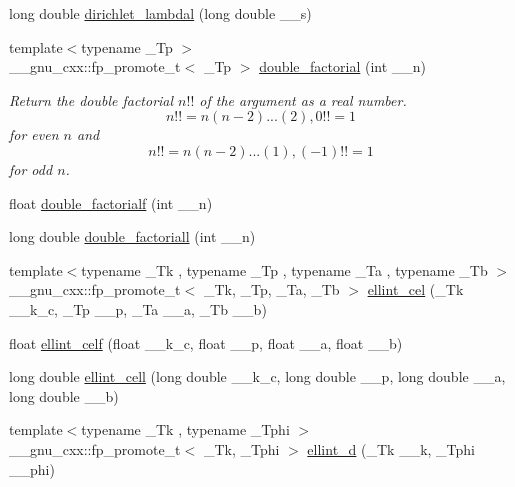 \begin{DoxyCompactItemize}
\item 
long double \hyperlink{group__gnu__math__spec__func_gab28d06c4e3c7457f1fa3663168678fb2}{dirichlet\+\_\+lambdal} (long double \+\_\+\+\_\+s)
\item 
{\footnotesize template$<$typename \+\_\+\+Tp $>$ }\\\+\_\+\+\_\+gnu\+\_\+cxx\+::fp\+\_\+promote\+\_\+t$<$ \+\_\+\+Tp $>$ \hyperlink{group__gnu__math__spec__func_ga1e62c47f84f9782828f8830b4fedc13c}{double\+\_\+factorial} (int \+\_\+\+\_\+n)
\begin{DoxyCompactList}\small\item\em Return the double factorial $ n!! $ of the argument as a real number. \[ n!! = n(n-2)...(2), 0!! = 1 \] for even $ n $ and \[ n!! = n(n-2)...(1), (-1)!! = 1 \] for odd $ n $. \end{DoxyCompactList}\item 
float \hyperlink{group__gnu__math__spec__func_ga85ec284e603f32d18970bbdbb12d5150}{double\+\_\+factorialf} (int \+\_\+\+\_\+n)
\item 
long double \hyperlink{group__gnu__math__spec__func_ga0366730a4a775256217ef1cd9d0c3a04}{double\+\_\+factoriall} (int \+\_\+\+\_\+n)
\item 
{\footnotesize template$<$typename \+\_\+\+Tk , typename \+\_\+\+Tp , typename \+\_\+\+Ta , typename \+\_\+\+Tb $>$ }\\\+\_\+\+\_\+gnu\+\_\+cxx\+::fp\+\_\+promote\+\_\+t$<$ \+\_\+\+Tk, \+\_\+\+Tp, \+\_\+\+Ta, \+\_\+\+Tb $>$ \hyperlink{group__gnu__math__spec__func_ga6e44a0d90500e56ef4b3aba6efd7e2b0}{ellint\+\_\+cel} (\+\_\+\+Tk \+\_\+\+\_\+k\+\_\+c, \+\_\+\+Tp \+\_\+\+\_\+p, \+\_\+\+Ta \+\_\+\+\_\+a, \+\_\+\+Tb \+\_\+\+\_\+b)
\item 
float \hyperlink{group__gnu__math__spec__func_ga6d8fbef7853cf37de11278b1ff7127e8}{ellint\+\_\+celf} (float \+\_\+\+\_\+k\+\_\+c, float \+\_\+\+\_\+p, float \+\_\+\+\_\+a, float \+\_\+\+\_\+b)
\item 
long double \hyperlink{group__gnu__math__spec__func_gaa5add699fb2b4b02e63f8725a3a79750}{ellint\+\_\+cell} (long double \+\_\+\+\_\+k\+\_\+c, long double \+\_\+\+\_\+p, long double \+\_\+\+\_\+a, long double \+\_\+\+\_\+b)
\item 
{\footnotesize template$<$typename \+\_\+\+Tk , typename \+\_\+\+Tphi $>$ }\\\+\_\+\+\_\+gnu\+\_\+cxx\+::fp\+\_\+promote\+\_\+t$<$ \+\_\+\+Tk, \+\_\+\+Tphi $>$ \hyperlink{group__gnu__math__spec__func_gad75103894786e6d7766bac4d8447b6cc}{ellint\+\_\+d} (\+\_\+\+Tk \+\_\+\+\_\+k, \+\_\+\+Tphi \+\_\+\+\_\+phi)

\end{DoxyCompactItemize}
